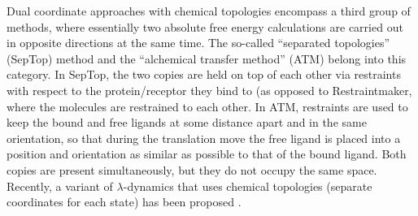 \documentclass[9pt,bestpractices,pubversion]{livecoms}
\begin{document}
Dual coordinate approaches with chemical topologies encompass a third group of methods, where essentially two absolute free energy calculations are carried out in opposite directions at the same time.
The so-called ``separated topologies'' (SepTop) method \cite{rocklin2013separated,Baumann_2023} and the ``alchemical transfer method'' (ATM) \cite{Azimi_2022} belong into this category. In SepTop, the two copies are held on top of each other via restraints with respect to the protein/receptor they bind to (as opposed to Restraintmaker, where the molecules are restrained to each other. %
In ATM, restraints are used to keep the bound and free ligands at some distance apart and in the same orientation, so that during the translation move the free ligand is placed into a position and orientation as similar as possible to that of the bound ligand. Both copies are present simultaneously, but they do not occupy the same space. Recently, a variant of $\lambda$-dynamics that uses chemical topologies (separate coordinates for each state) has been proposed \cite{Liesen_2024}.
  

\end{document}
